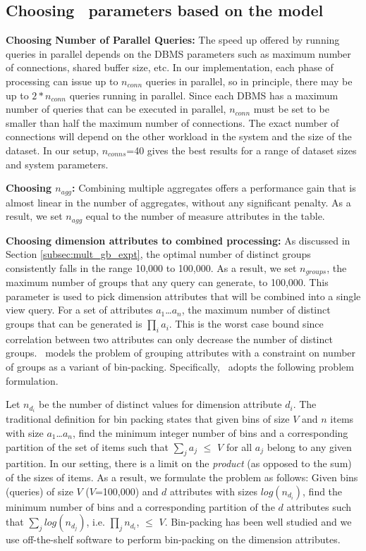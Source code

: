 \subsection{Choosing \VizRecDB\ parameters based on the model}

{\bf Choosing Number of Parallel Queries:} The speed up offered by running
queries in parallel depends on the DBMS parameters such as maximum number of
connections, shared buffer size, etc. In our implementation, each phase of
processing can issue up to $n_{conn}$ queries in parallel, so in principle,
there may be up to $2 \ast n_{conn}$ queries running in parallel. Since each
DBMS has a maximum number of queries that can be executed in parallel,
$n_{conn}$ must be set to be smaller than half the maximum number of
connections. The exact number of connections will depend on the other workload
in the system and the size of the dataset. In our setup, $n_{conns}$=40 gives
the best results for a range of dataset sizes and system parameters.

{\bf Choosing $n_{agg}$:} Combining multiple aggregates offers a performance
gain that is almost linear in the number of aggregates, without any significant
penalty. As a result, we set $n_{agg}$ equal to the number of measure attributes
in the table.

{\bf Choosing dimension attributes to combined processing:}  As discussed in
Section \ref{subsec:mult_gb_expt}, the optimal number of distinct groups
consistently falls in the range 10,000 to 100,000. As a result, we set
$n_{groups}$, the maximum number of groups that any query can generate, to
100,000.
This parameter is used to pick dimension attributes that will be combined into a
single view query. For a set of attributes $a_1$\ldots$a_n$, the maximum number
of distinct groups that can be generated is $\prod_i a_i$. This is the worst
case bound since correlation between two attributes can only decrease the number
of distinct groups. \VizRecDB\ models the problem of grouping attributes with a
constraint on number of groups as a variant of bin-packing.
Specifically, \VizRecDB\ adopts the following problem formulation.

Let $n_{d_{i}}$ be the number of distinct values for dimension attribute $d_i$.
The traditional definition for bin packing states that given bins of size $V$
and $n$ items with size $a_1$\ldots$a_n$, find the minimum integer number of
bins and a corresponding partition of the set of items such that $\sum_{j} a_j$
$\leq$ $V$ for all $a_j$ belong to any given partition. In our setting, there is
a limit on the {\it product} (as opposed to the sum) of the sizes of items. As a
result, we formulate the problem as follows: Given bins (queries) of size $V$
($V$=100,000) and $d$ attributes with sizes $log(n_{d_{i}})$, find
the minimum number of bins and a corresponding partition of the $d$ attributes
such that $\sum_{j} log(n_{d_{j}})$, i.e. $\prod_{j} n_{d_{i}}$, $\leq$ $V$.
Bin-packing has been well studied and we use off-the-shelf software
\cite{glpk} to perform bin-packing on the dimension attributes.

